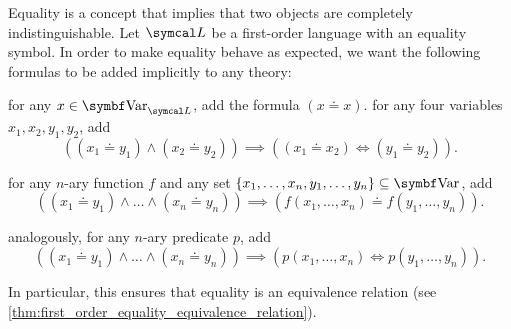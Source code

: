 \begin{remark}\label{note:first_order_equality}\cite[definition 5.1]{Nerode2012}
  Equality is a concept that implies that two objects are completely indistinguishable. Let \( \Cal{L} \) be a first-order language with an equality symbol. In order to make equality behave as expected, we want the following formulas to be added implicitly to any theory:

  \begin{defenum}
     for any \( x \in \Bold{Var}_{\Cal{L}} \), add the formula \( (x \doteq x) \).
     for any four variables \( x_1, x_2, y_1, y_2 \), add
    \begin{equation*}
      ((x_1 \doteq y_1) \land (x_2 \doteq y_2)) \implies ((x_1 \doteq x_2) \iff (y_1 \doteq y_2)).
    \end{equation*}

     for any \( n \)-ary function \( f \) and any set \( \{ x_1, \ldots, x_n, y_1, \ldots, y_n \} \subseteq \Bold{Var} \), add
    \begin{equation*}
      ((x_1 \doteq y_1) \land \ldots \land (x_n \doteq y_n)) \implies (f(x_1, \ldots, x_n) \doteq f(y_1, \ldots, y_n)).
    \end{equation*}

     analogously, for any \( n \)-ary predicate \( p \), add
    \begin{equation*}
      ((x_1 \doteq y_1) \land \ldots \land (x_n \doteq y_n)) \implies (p(x_1, \ldots, x_n) \iff p(y_1, \ldots, y_n)).
    \end{equation*}
  \end{defenum}

  In particular, this ensures that equality is an equivalence relation (see \cref{thm:first_order_equality_equivalence_relation}).
\end{remark}

